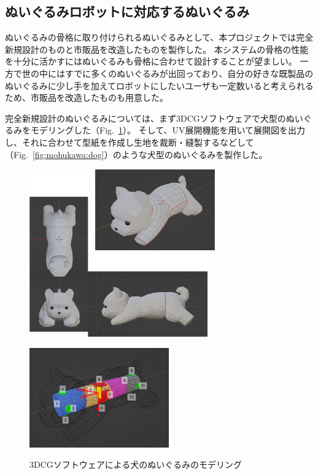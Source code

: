 \documentclass[uplatex,a4paper,12pt]{jsarticle}
\renewcommand{\figurename}{Fig.}
\newcommand{\figref}[1]{\figurename~\ref{#1}}
\begin{document}
\subsection{ぬいぐるみロボットに対応するぬいぐるみ}
ぬいぐるみの骨格に取り付けられるぬいぐるみとして、本プロジェクトでは完全新規設計のものと市販品を改造したものを製作した。
本システムの骨格の性能を十分に活かすにはぬいぐるみも骨格に合わせて設計することが望ましい。
一方で世の中にはすでに多くのぬいぐるみが出回っており、自分の好きな既製品のぬいぐるみに少し手を加えてロボットにしたいユーザも一定数いると考えられるため、市販品を改造したものも用意した。

完全新規設計のぬいぐるみについては、まず3DCGソフトウェアで犬型のぬいぐるみをモデリングした（\figref{fig:mohukawa:blender}）。
そして、UV展開機能を用いて展開図を出力し、それに合わせて型紙を作成し生地を裁断・縫製するなどして（\figref{fig:mohukawa:dog}）のような犬型のぬいぐるみを製作した。

\begin{figure}[htbp]
  \centering
  \begin{minipage}[c]{0.56\linewidth}
    \centering
    \includegraphics[keepaspectratio,width=8cm,clip]{images/mohukawa/blender_01.png}
    \label{fig:mohukawa:blender_01}
  \end{minipage}
  \begin{minipage}[c]{0.40\linewidth}
    \centering
    \includegraphics[keepaspectratio,width=6cm,clip]{images/mohukawa/dog_sensor.png}
    \label{fig:mohukawa:blender_02}
  \end{minipage}
  \caption{3DCGソフトウェアによる犬のぬいぐるみのモデリング}
  \label{fig:mohukawa:blender}
\end{figure}
\end{document}
